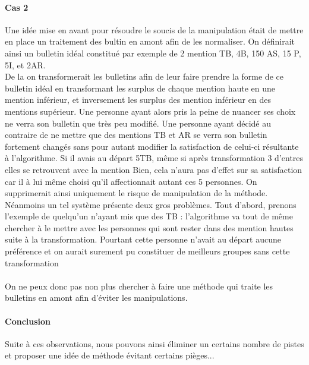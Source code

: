 \documentclass[10pt,a4paper]{scrartcl}
\begin{document}
\paragraph{Cas 2}
Une idée mise en avant pour résoudre le soucis de la manipulation était de mettre en place un traitement des bultin en amont afin de les normaliser.
On définirait ainsi un bulletin idéal constitué par exemple de 2 mention TB, 4B, 150 AS, 15 P, 5I, et 2AR.\\
De la on transformerait les bulletins afin de leur faire prendre la forme de ce bulletin idéal en transformant les surplus de chaque mention haute en une mention inférieur, et inversement les surplus des mention inférieur en des mentions supérieur.
Une personne ayant alors pris la peine de nuancer ses choix ne verra son bulletin que très peu modifié. Une personne ayant décidé au contraire de ne mettre que des mentions TB et AR se verra son bulletin fortement changés sans pour autant modifier la satisfaction de celui-ci résultante à l'algorithme. Si il avais au départ 5TB, même si après transformation 3 d'entres elles se retrouvent avec la mention Bien, cela n'aura pas d'effet sur sa satisfaction car il à lui même choisi qu'il affectionnait autant ces 5 personnes. On supprimerait ainsi uniquement le risque de manipulation de la méthode.\\
Néanmoins un tel système présente deux gros problèmes. Tout d'abord, prenons l'exemple de quelqu'un n'ayant mis que des TB : l'algorithme va tout de même chercher à le mettre avec les personnes qui sont rester dans des mention hautes suite à la transformation. Pourtant cette personne n'avait au départ aucune préférence et on aurait surement pu constituer de meilleurs groupes sans cette transformation\\
\\
On ne peux donc pas non plus chercher à faire une méthode qui traite les bulletins en amont afin d'éviter les manipulations.
\paragraph{Conclusion}
Suite à ces observations, nous pouvons ainsi éliminer un certains nombre de pistes et proposer une idée de méthode évitant certains pièges...
\end{document}
